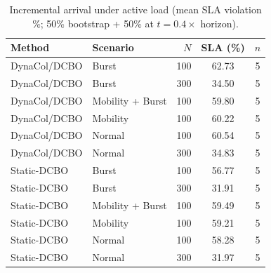 \begin{table}[!t]
\centering
\caption{Incremental arrival under active load (mean SLA violation \%; 50\% bootstrap + 50\% at $t=0.4\times$ horizon).}
\label{tab:incremental_arrival}
\fgcsTableCol
\begin{tabular*}{\columnwidth}{@{\extracolsep{\fill}}llrcc@{}}
\toprule
\textbf{Method} & \textbf{Scenario} & \textbf{$N$} & \textbf{SLA (\%)} & \textbf{$n$} \\
\midrule
DynaCol/DCBO & Burst & 100 & 62.73 & 5 \\
DynaCol/DCBO & Burst & 300 & 34.50 & 5 \\
DynaCol/DCBO & Mobility + Burst & 100 & 59.80 & 5 \\
DynaCol/DCBO & Mobility & 100 & 60.22 & 5 \\
DynaCol/DCBO & Normal & 100 & 60.54 & 5 \\
DynaCol/DCBO & Normal & 300 & 34.83 & 5 \\
Static-DCBO & Burst & 100 & 56.77 & 5 \\
Static-DCBO & Burst & 300 & 31.91 & 5 \\
Static-DCBO & Mobility + Burst & 100 & 59.49 & 5 \\
Static-DCBO & Mobility & 100 & 59.21 & 5 \\
Static-DCBO & Normal & 100 & 58.28 & 5 \\
Static-DCBO & Normal & 300 & 31.97 & 5 \\
\bottomrule
\end{tabular*}
\end{table}